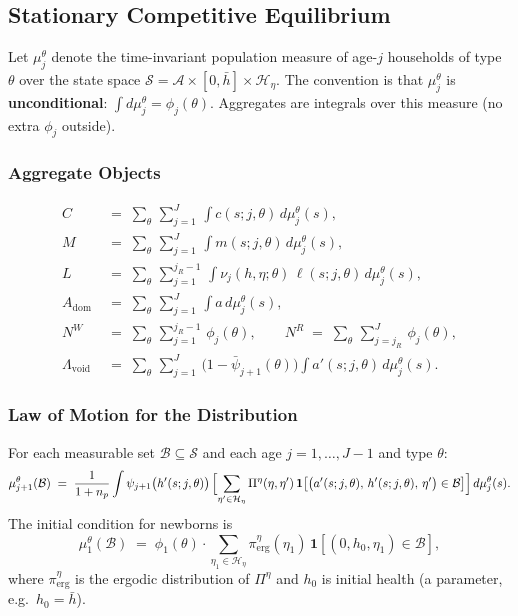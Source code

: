 \documentclass[12pt,a4paper]{article}
\begin{document}
\subsection{Stationary Competitive Equilibrium}
\label{subsec:equilibrium}

Let $\mu_j^\theta$ denote the time-invariant population measure of age-$j$ households of type $\theta$ over the state space $\mathcal{S} = \mathcal{A} \times [0, \bar h] \times \mathcal{H}_\eta$. The convention is that $\mu_j^\theta$ is \textbf{unconditional}: $\int d\mu_j^\theta = \phi_j(\theta)$. Aggregates are integrals over this measure (no extra $\phi_j$ outside).
 
\subsubsection{Aggregate Objects}
 
\begin{align}
C &\;=\; \sum_\theta\, \sum_{j=1}^{J}\, \int c(s; j, \theta)\, d\mu_j^\theta(s), \label{eq:agg_C}\\
M &\;=\; \sum_\theta\, \sum_{j=1}^{J}\, \int m(s; j, \theta)\, d\mu_j^\theta(s), \label{eq:agg_M}\\
L &\;=\; \sum_\theta\, \sum_{j=1}^{j_R - 1}\, \int \nu_j(h, \eta; \theta)\, \ell(s; j, \theta)\, d\mu_j^\theta(s), \label{eq:agg_L}\\
A_{\mathrm{dom}} &\;=\; \sum_\theta\, \sum_{j=1}^{J}\, \int a\, d\mu_j^\theta(s), \label{eq:agg_A}\\
N^W &\;=\; \sum_\theta\, \sum_{j=1}^{j_R - 1}\, \phi_j(\theta), \qquad N^R \;=\; \sum_\theta\, \sum_{j=j_R}^{J}\, \phi_j(\theta), \label{eq:agg_NWR}\\
\Lambda_{\mathrm{void}} &\;=\; \sum_\theta\, \sum_{j=1}^{J}\, \bigl(1 - \bar\psi_{j+1}(\theta)\bigr) \int a'(s; j, \theta)\, d\mu_j^\theta(s). \label{eq:agg_Lvoided}
\end{align}

\subsubsection{Law of Motion for the Distribution}
 
For each measurable set $\mathcal{B} \subseteq \mathcal{S}$ and each age $j = 1, \ldots, J-1$ and type $\theta$:
\begin{equation}
\label{eq:lom}
\mu_{j+1}^\theta(\mathcal{B})
\;=\;
\frac{1}{1 + n_p}
\int
\psi_{j+1}\bigl(h'(s; j, \theta)\bigr)\,
\Bigl[\sum_{\eta' \in \mathcal{H}_\eta}
\Pi^\eta(\eta, \eta')\,
\mathbf{1}\bigl[\bigl(a'(s; j, \theta),\, h'(s; j, \theta),\, \eta'\bigr) \in \mathcal{B}\bigr]
\Bigr]
\, d\mu_j^\theta(s).
\end{equation}
The initial condition for newborns is
\begin{equation}
\label{eq:initial_dist}
\mu_1^\theta(\mathcal{B})
\;=\;
\phi_1(\theta) \cdot
\sum_{\eta_1 \in \mathcal{H}_\eta} \pi^\eta_{\mathrm{erg}}(\eta_1)\,
\mathbf{1}[(0, h_0, \eta_1) \in \mathcal{B}],
\end{equation}
where $\pi^\eta_{\mathrm{erg}}$ is the ergodic distribution of $\Pi^\eta$ and $h_0$ is initial health (a parameter, e.g.\ $h_0 = \bar h$).
\end{document}
